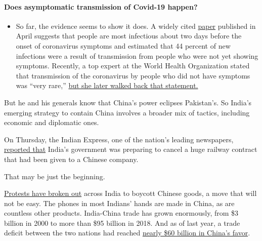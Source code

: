 \begin{itemize}
{  \paragraph{Does asymptomatic transmission of Covid-19
  happen?}\label{does-asymptomatic-transmission-of-covid-19-happen}}

  \begin{itemize}
  \tightlist
  \item
    So far, the evidence seems to show it does. A widely cited
    \href{https://www.nature.com/articles/s41591-020-0869-5}{paper}
    published in April suggests that people are most infectious about
    two days before the onset of coronavirus symptoms and estimated that
    44 percent of new infections were a result of transmission from
    people who were not yet showing symptoms. Recently, a top expert at
    the World Health Organization stated that transmission of the
    coronavirus by people who did not have symptoms was ``very rare,''
    \href{https://www.nytimes.com/2020/06/09/world/coronavirus-updates.html?action=click\&pgtype=Article\&state=default\&region=MAIN_CONTENT_3\&context=storylines_faq\#link-1f302e21}{but
    she later walked back that statement.}
  \end{itemize}
\end{itemize}

But he and his generals know that China's power eclipses Pakistan's. So
India's emerging strategy to contain China involves a broader mix of
tactics, including economic and diplomatic ones.

On Thursday, the Indian Express, one of the nation's leading newspapers,
\href{https://indianexpress.com/article/business/economy/border-dispute-chinese-firms-india-business-railways-telecom-6464148/}{reported
that} India's government was preparing to cancel a huge railway contract
that had been given to a Chinese company.

That may be just the beginning.

\href{https://www.youtube.com/watch?v=UB0Di0zLHFk}{Protests have broken
out} across India to boycott Chinese goods, a move that will not be
easy. The phones in most Indians' hands are made in China, as are
countless other products. India-China trade has grown enormously, from
\$3 billion in 2000 to more than \$95 billion in 2018. And as of last
year, a trade deficit between the two nations had reached
\href{https://www.nytimes.com/2019/10/11/world/asia/narendra-modi-xi-jinping-india-china.html}{nearly
\$60 billion in China's favor}.

